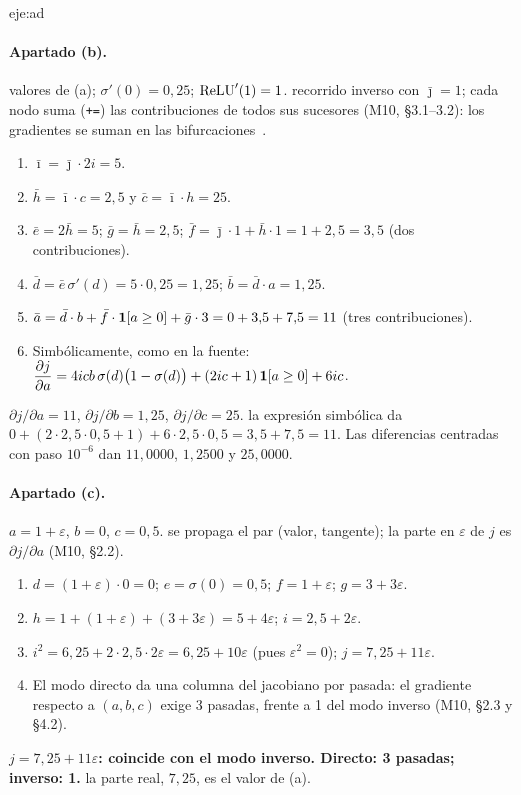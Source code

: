 \begin{solucion}{eje:ad}
\paragraph{Apartado (b).}
\datos valores de (a); $\sigma'(0)=0{,}25$; $\operatorname{ReLU}'(1)=1$.
\planteamiento recorrido inverso con $\bar\jmath=1$; cada nodo suma (\texttt{+=}) las contribuciones de todos sus sucesores (M10, §3.1--3.2): los gradientes se suman en las bifurcaciones~\cite{cs231n}.
\pasos
\begin{enumerate}[label=\arabic*.]
  \item $\bar\imath=\bar\jmath\cdot 2i=5$.
  \item $\bar h=\bar\imath\cdot c=2{,}5$ y $\bar c=\bar\imath\cdot h=25$.
  \item $\bar e=2\bar h=5$; $\bar g=\bar h=2{,}5$; $\bar f=\bar\jmath\cdot 1+\bar h\cdot 1=1+2{,}5=3{,}5$ (dos contribuciones).
  \item $\bar d=\bar e\,\sigma'(d)=5\cdot 0{,}25=1{,}25$; $\bar b=\bar d\cdot a=1{,}25$.
  \item $\bar a=\bar d\cdot b+\bar f\cdot\mathbf{1}[a\ge 0]+\bar g\cdot 3=0+3{,}5+7{,}5=11$ (tres contribuciones).
  \item Simbólicamente, como en la fuente: $\dfrac{\partial j}{\partial a}=4icb\,\sigma(d)\bigl(1-\sigma(d)\bigr)+(2ic+1)\,\mathbf{1}[a\ge 0]+6ic$.
\end{enumerate}
\resultado $\partial j/\partial a=11$, $\partial j/\partial b=1{,}25$, $\partial j/\partial c=25$.
\comprobacion la expresión simbólica da $0+(2\cdot 2{,}5\cdot 0{,}5+1)+6\cdot 2{,}5\cdot 0{,}5=3{,}5+7{,}5=11$. Las diferencias centradas con paso $10^{-6}$ dan $11{,}0000$, $1{,}2500$ y $25{,}0000$.

\paragraph{Apartado (c).}
\datos $a=1+\varepsilon$, $b=0$, $c=0{,}5$.
\planteamiento se propaga el par (valor, tangente); la parte en $\varepsilon$ de $j$ es $\partial j/\partial a$ (M10, §2.2).
\pasos
\begin{enumerate}[label=\arabic*.]
  \item $d=(1+\varepsilon)\cdot 0=0$; $e=\sigma(0)=0{,}5$; $f=1+\varepsilon$; $g=3+3\varepsilon$.
  \item $h=1+(1+\varepsilon)+(3+3\varepsilon)=5+4\varepsilon$; $i=2{,}5+2\varepsilon$.
  \item $i^{2}=6{,}25+2\cdot 2{,}5\cdot 2\varepsilon=6{,}25+10\varepsilon$ (pues $\varepsilon^{2}=0$); $j=7{,}25+11\varepsilon$.
  \item El modo directo da una columna del jacobiano por pasada: el gradiente respecto a $(a,b,c)$ exige 3 pasadas, frente a 1 del modo inverso (M10, §2.3 y §4.2).
\end{enumerate}
\resultado \textbf{$j=7{,}25+11\varepsilon$: coincide con el modo inverso. Directo: 3 pasadas; inverso: 1.}
\comprobacion la parte real, $7{,}25$, es el valor de (a).


\end{solucion}
